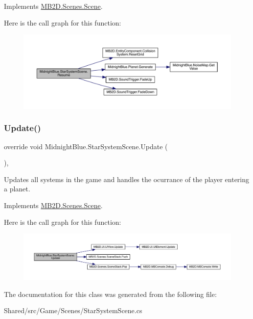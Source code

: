Implements \hyperlink{class_m_b2_d_1_1_scenes_1_1_scene_ad13639db22b059a1b714eefd9d927735}{M\+B2\+D.\+Scenes.\+Scene}.

Here is the call graph for this function\+:\nopagebreak
\begin{figure}[H]
\begin{center}
\leavevmode
\includegraphics[width=350pt]{class_midnight_blue_1_1_star_system_scene_aefbf0750a7ce153b923bcabb132e4875_cgraph}
\end{center}
\end{figure}
\hypertarget{class_midnight_blue_1_1_star_system_scene_ac36506b721064e015a9f93140681d93a}{}\label{class_midnight_blue_1_1_star_system_scene_ac36506b721064e015a9f93140681d93a} 
\subsubsection{\texorpdfstring{Update()}{Update()}}
{\footnotesize\ttfamily override void Midnight\+Blue.\+Star\+System\+Scene.\+Update (\begin{DoxyParamCaption}{ }\end{DoxyParamCaption})\hspace{0.3cm}{\ttfamily [inline]}, {\ttfamily [virtual]}}



Updates all systems in the game and handles the ocurrance of the player entering a planet. 



Implements \hyperlink{class_m_b2_d_1_1_scenes_1_1_scene_a779de7c1ab23b698dcde3a228324a991}{M\+B2\+D.\+Scenes.\+Scene}.

Here is the call graph for this function\+:\nopagebreak
\begin{figure}[H]
\begin{center}
\leavevmode
\includegraphics[width=350pt]{class_midnight_blue_1_1_star_system_scene_ac36506b721064e015a9f93140681d93a_cgraph}
\end{center}
\end{figure}


The documentation for this class was generated from the following file\+:\begin{DoxyCompactItemize}
\item 
Shared/src/\+Game/\+Scenes/Star\+System\+Scene.\+cs\end{DoxyCompactItemize}
